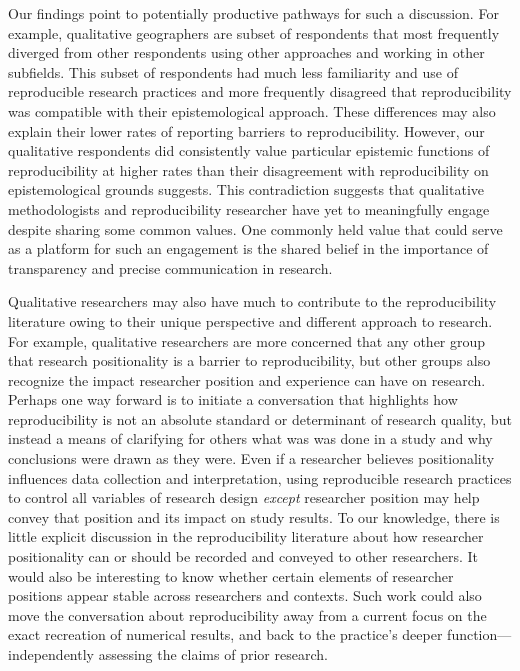 \documentclass[]{interact}
\theoremstyle{plain}%
\theoremstyle{definition}
\theoremstyle{remark}
\begin{document}
Our findings point to potentially productive pathways for such a discussion. 
For example, qualitative geographers are subset of respondents that most frequently diverged from other respondents using other approaches and working in other subfields.
This subset of respondents had much less familiarity and use of reproducible research practices and more frequently disagreed that reproducibility was compatible with their epistemological approach.
These differences may also explain their lower rates of reporting barriers to reproducibility. 
However, our qualitative respondents did consistently value particular epistemic functions of reproducibility at higher rates than their disagreement with reproducibility on epistemological grounds suggests.
This contradiction suggests that qualitative methodologists and reproducibility researcher have yet to meaningfully engage despite sharing some common values.
One commonly held value that could serve as a platform for such an engagement is the shared belief in the importance of transparency and precise communication in research.

Qualitative researchers may also have much to contribute to the reproducibility literature owing to their unique perspective and different approach to research.  
For example, qualitative researchers are more concerned that any other group that research positionality is a barrier to reproducibility, but other groups also recognize the impact researcher position and experience can have on research.
Perhaps one way forward is to initiate a conversation that highlights how reproducibility is not an absolute standard or determinant of research quality, but instead a means of clarifying for others what was was done in a study and why conclusions were drawn as they were.
Even if a researcher believes positionality influences data collection and interpretation, using reproducible research practices to control all variables of research design \textit{except} researcher position may help convey that position and its impact on study results.
To our knowledge, there is little explicit discussion in the reproducibility literature about how researcher positionality can or should be recorded and conveyed to other researchers. 
It would also be interesting to know whether certain elements of researcher positions appear stable across researchers and contexts.
Such work could also move the conversation about reproducibility away from a current focus on the exact recreation of numerical results, and back to the practice's deeper function---independently assessing the claims of prior research. 
\end{document}
